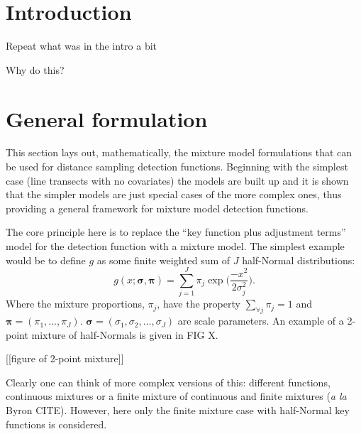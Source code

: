 \section{Introduction}

Repeat what was in the intro a bit

Why do this?



\section{General formulation}

This section lays out, mathematically, the mixture model formulations that can be used for distance sampling detection functions. Beginning with the simplest case (line transects with no covariates) the models are built up and it is shown that the simpler models are just special cases of the more complex ones, thus providing a general framework for mixture model detection functions.

The core principle here is to replace the ``key function plus adjustment terms'' model for the detection function with a mixture model. The simplest example would be to define $g$ as some finite weighted sum of $J$ half-Normal distributions:
\begin{equation}
g(x;\bm{\sigma},\bm{\pi}) = \sum_{j=1}^J \pi_j \exp \Big( \frac{-x^2}{2 \sigma_j^2}\Big).
\label{mmds-simplemix}
\end{equation}
Where the mixture proportions, $\pi_j$, have the property $\sum_{\forall j}\pi_j=1$ and $\bm{\pi} = (\pi_1, \dots, \pi_J)$. $\bm{\sigma}=(\sigma_1,\sigma_2,\dots,\sigma_J)$ are scale parameters. An example of a 2-point mixture of half-Normals is given in FIG X.

[[figure of 2-point mixture]]

Clearly one can think of more complex versions of this: different functions, continuous mixtures or a finite mixture of continuous and finite mixtures (\textit{a la} Byron CITE). However, here only the finite mixture case with half-Normal key functions is considered.

